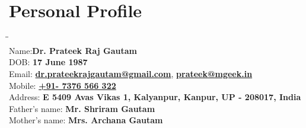 \vspace{-2em}
\section{Personal Profile}
\vspace{-2.5em}
\begin{tabbing}
\=\hspace{7em}\= \kill \\
\>Name:\>\textbf{{Dr. Prateek Raj Gautam}} \\
\>DOB: \>\textbf{{17 June 1987}}\\ 
\>Email: \>\textbf{{\href{mailto:dr.prateekrajgautam@gmail.com}{dr.prateekrajgautam@gmail.com}}},  \textbf{{\href{mailto:prateek@mgeek.in}{prateek@mgeek.in}}} \\
\>Mobile: \>\textbf{{\href{https://t.me/prateekrajgautam}{+91- 7376 566 322}}}\\
\>Address: \>\textbf{{E 540\/9 Avas Vikas 1, Kalyanpur, Kanpur, UP - 208017, India}}\\
\>Father’s name: \>\textbf{{Mr. Shriram Gautam}} \\
\>Mother’s name: \>\textbf{{Mrs. Archana Gautam}}
\end{tabbing}
\vspace{-2em}
\sectionline
